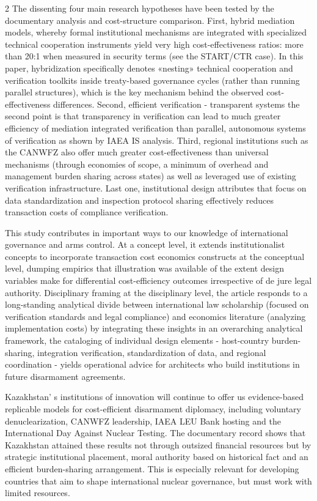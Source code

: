 \begin{multicols}{2}
The dissenting four main research hypotheses have been tested by the
documentary analysis and cost-structure comparison. First, hybrid
mediation models, whereby formal institutional mechanisms are integrated
with specialized technical cooperation instruments yield very high
cost-effectiveness ratios: more than 20:1 when measured in security
terms (see the START/CTR case). In this paper, hybridization
specifically denotes «nesting» technical cooperation and verification
toolkits inside treaty-based governance cycles (rather than running
parallel structures), which is the key mechanism behind the observed
cost-effectiveness differences. Second, efficient verification -
transparent systems the second point is that transparency in
verification can lead to much greater efficiency of mediation integrated
verification than parallel, autonomous systems of verification as shown
by IAEA IS analysis. Third, regional institutions such as the CANWFZ
also offer much greater cost-effectiveness than universal mechanisms
(through economies of scope, a minimum of overhead and management burden
sharing across states) as well as leveraged use of existing verification
infrastructure. Last one, institutional design attributes that focus on
data standardization and inspection protocol sharing effectively reduces
transaction costs of compliance verification.

This study contributes in important ways to our knowledge of
international governance and arms control. At a concept level, it
extends institutionalist concepts to incorporate transaction cost
economics constructs at the conceptual level, dumping empirics that
illustration was available of the extent design variables make for
differential cost-efficiency outcomes irrespective of de jure legal
authority. Disciplinary framing at the disciplinary level, the article
responds to a long-standing analytical divide between international law
scholarship (focused on verification standards and legal compliance) and
economics literature (analyzing implementation costs) by integrating
these insights in an overarching analytical framework, the cataloging of
individual design elements - host-country burden-sharing, integration
verification, standardization of data, and regional coordination -
yields operational advice for architects who build institutions in
future disarmament agreements.

Kazakhstan' s institutions of innovation will continue to
offer us evidence-based replicable models for cost-efficient disarmament
diplomacy, including voluntary denuclearization, CANWFZ leadership, IAEA
LEU Bank hosting and the International Day Against Nuclear Testing. The
documentary record shows that Kazakhstan attained these results not
through outsized financial resources but by strategic institutional
placement, moral authority based on historical fact and an efficient
burden-sharing arrangement. This is especially relevant for developing
countries that aim to shape international nuclear governance, but must
work with limited resources.


\end{multicols}

